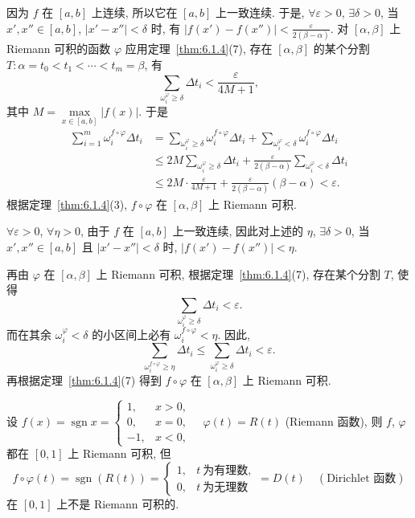 \begin{solution}[证法 2]
因为 $f$ 在 $[a,b]$ 上连续, 所以它在 $[a,b]$ 上一致连续. 于是, $\forall\varepsilon>0$, $\exists\delta>0$, 当 $x',x''\in[a,b]$, $|x'-x''|<\delta$ 时, 有 $|f(x')-f(x'')|<\frac{\varepsilon}{2(\beta-\alpha)}$. 对 $[\alpha,\beta]$ 上 Riemann 可积的函数 $\varphi$ 应用定理~\ref{thm:6.1.4}(7), 存在 $[\alpha,\beta]$ 的某个分割 $T:\alpha=t_{0}<t_{1}<\cdots<t_{m}=\beta$, 有
\[
\sum_{\omega_{i}^{\varphi}\geqslant\delta}\Delta t_{i}<\frac{\varepsilon}{4M+1},
\]
其中 $M=\max\limits_{x\in[a,b]}|f(x)|$. 于是
\begin{align*}
\sum_{i=1}^{m}\omega_{i}^{f\circ\varphi}\Delta t_{i}&=\sum_{\omega_{i}^{\varphi}\geqslant\delta}\omega_{i}^{f\circ\varphi}\Delta t_{i}+\sum_{\omega_{i}^{\varphi}<\delta}\omega_{i}^{f\circ\varphi}\Delta t_{i}\\
&\leqslant 2M\sum_{\omega_{i}^{\varphi}\geqslant\delta}\Delta t_{i}+\frac{\varepsilon}{2(\beta-\alpha)}\sum_{\omega_{i}^{\varphi}<\delta}\Delta t_{i}\\
&\leqslant 2M\cdot\frac{\varepsilon}{4M+1}+\frac{\varepsilon}{2(\beta-\alpha)}(\beta-\alpha)<\varepsilon.
\end{align*}
根据定理~\ref{thm:6.1.4}(3), $f\circ\varphi$ 在 $[\alpha,\beta]$ 上 Riemann 可积.
\end{solution}

\begin{solution}[证法 3]
$\forall\varepsilon>0$, $\forall\eta>0$, 由于 $f$ 在 $[a,b]$ 上一致连续, 因此对上述的 $\eta$, $\exists\delta>0$, 当 $x',x''\in[a,b]$ 且 $|x'-x''|<\delta$ 时, $|f(x')-f(x'')|<\eta$.

再由 $\varphi$ 在 $[\alpha,\beta]$ 上 Riemann 可积, 根据定理~\ref{thm:6.1.4}(7), 存在某个分割 $T$, 使得
\[
\sum_{\omega_{i}^{\varphi}\geqslant\delta}\Delta t_{i}<\varepsilon.
\]
而在其余 $\omega_{i}^{\varphi}<\delta$ 的小区间上必有 $\omega_{i}^{f\circ\varphi}<\eta$. 因此,
\[
\sum_{\omega_{i}^{f\circ\varphi}\geqslant\eta}\Delta t_{i}\leqslant\sum_{\omega_{i}^{\varphi}\geqslant\delta}\Delta t_{i}<\varepsilon.
\]
再根据定理~\ref{thm:6.1.4}(7) 得到 $f\circ\varphi$ 在 $[\alpha,\beta]$ 上 Riemann 可积.
\end{solution}

\begin{solution}[反例 1]
设 $f(x)=\operatorname{sgn}x=\begin{cases}1,&x>0,\\0,&x=0,\\-1,&x<0,\end{cases}\quad \varphi(t)=R(t)$ (Riemann 函数), 则 $f$, $\varphi$ 都在 $[0,1]$ 上 Riemann 可积, 但
\[
f\circ\varphi(t)=\operatorname{sgn}(R(t))=\begin{cases}1,&t\ \text{为有理数},\\0,&t\ \text{为无理数}\end{cases}=D(t)\quad(\text{Dirichlet 函数})
\]
在 $[0,1]$ 上不是 Riemann 可积的.
\end{solution}

